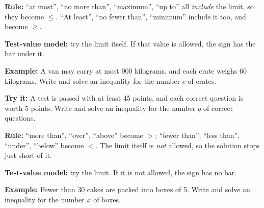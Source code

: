 \documentclass[12pt]{article}
\begin{document}


\begin{formulabox}
\textbf{Rule:} ``at most'', ``no more than'', ``maximum'', ``up to'' all
\emph{include} the limit, so they become $\le$. ``At least'', ``no fewer than'',
``minimum'' include it too, and become $\ge$.\par
\textbf{Test-value model:} try the limit itself. If that value is allowed, the
sign has the bar under it.
\end{formulabox}

\begin{examplebox}
\textbf{Example:} \quad A van may carry at most 900 kilograms, and each crate
weighs 60 kilograms. Write and solve an inequality for the number $c$ of crates.
\end{examplebox}

\begin{tryitbox}
\textbf{Try it:} \quad A test is passed with at least 45 points, and each
correct question is worth 5 points. Write and solve an inequality for the number
$q$ of correct questions.\\[2pt]
\end{tryitbox}


\begin{formulabox}
\textbf{Rule:} ``more than'', ``over'', ``above'' become $>$; ``fewer than'',
``less than'', ``under'', ``below'' become $<$. The limit itself is \emph{not}
allowed, so the solution stops just short of it.\par
\textbf{Test-value model:} try the limit. If it is not allowed, the sign has no
bar.
\end{formulabox}

\begin{examplebox}
\textbf{Example:} \quad Fewer than 30 cakes are packed into boxes of 5. Write
and solve an inequality for the number $x$ of boxes.
\end{examplebox}
\end{document}
